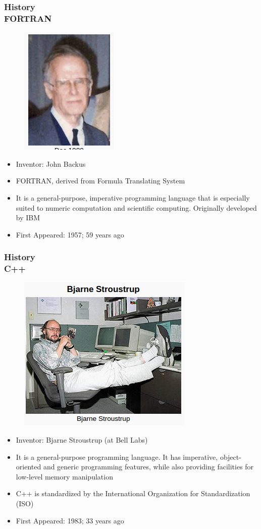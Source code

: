 \documentclass[hyperref={pdfpagelabels=true}]{beamer}
\begin{document}
\begin{frame}
\frametitle{History \\ {\large FORTRAN}}
\begin{figure}[!tbp]
\centering
\includegraphics[scale = 0.35]{figs/Selection_007.png}
\end{figure}
\begin{itemize}
\item Inventor: John Backus
\item[\ding{45}]  FORTRAN, derived from Formula Translating System
\item It is a general-purpose, imperative programming language that is especially suited to numeric computation and scientific computing. Originally developed by IBM
\item First Appeared: 1957; 59 years ago
\end{itemize}
\end{frame}

\begin{frame}
\frametitle{History \\ {\large C++}}
\begin{figure}[!tbp]
\centering
\includegraphics[scale = 0.35]{figs/cpr.png}
\end{figure}
\scriptsize{
\begin{itemize}
\item Inventor: Bjarne Stroustrup (at Bell Labs)
\item It is a general-purpose programming language. It has imperative, object-oriented and generic programming features, while also providing facilities for low-level memory manipulation
\item C++ is standardized by the International Organization for Standardization (ISO)
\item First Appeared: 1983; 33 years ago
\end{itemize}}
\end{frame}
\end{document}
